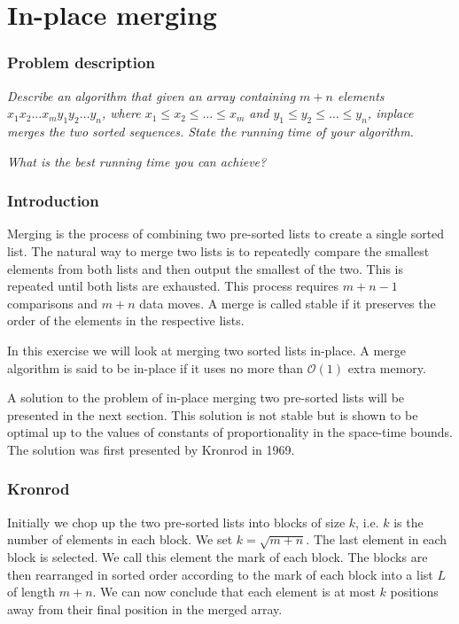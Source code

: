 \documentclass[a4paper,oneside,article,11pt]{memoir}
\begin{document}
\chapter{In-place merging}
\label{chp:inplace}
\subsection{Problem description}
\textit{Describe an algorithm that given an array containing $m+n$ elements $x_1x_2\dots x_m y_1y_2\dots y_n$, where $x_1\leq x_2\leq \dots \leq x_m$ and $y_1\leq y_2\leq \dots \leq y_n$, inplace merges the two sorted sequences. State the running time of your algorithm.}

\textit{What is the best running time you can achieve?}

\subsection{Introduction}
Merging is the process of combining two pre-sorted lists to create a single sorted list. The natural way to merge two lists is to repeatedly compare the smallest elements from both lists and then output the smallest of the two. This is repeated until both lists are exhausted. This process requires $m+n-1$ comparisons and $m+n$ data moves. A merge is called stable if it preserves the order of the elements in the respective lists.

In this exercise we will look at merging two sorted lists in-place. A merge algorithm is said to be in-place if it uses no more than $\mathcal{O}(1)$ extra memory.

A solution to the problem of in-place merging two pre-sorted lists will be presented in the next section. This solution is not stable but is shown to be optimal up to the values of constants of proportionality in the space-time bounds. The solution was first presented by Kronrod in 1969\cite{Kronrod}.

\subsection{Kronrod}
Initially we chop up the two pre-sorted lists into blocks of size $k$, i.e. $k$ is the number of elements in each block. We set $k =\sqrt{m+n}$. The last element in each block is selected. We call this element the mark of each block. The blocks are then rearranged in sorted order according to the mark of each block into a list $L$ of length $m+n$. We can now conclude that each element is at most $k$ positions away from their final position in the merged array.
\end{document}
